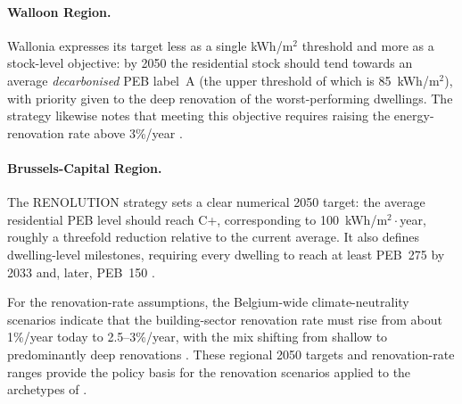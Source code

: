 \paragraph{Walloon Region.} Wallonia expresses its target less as a single
kWh/m$^2$ threshold and more as a stock-level objective: by 2050 the residential
stock should tend towards an average \emph{decarbonised} PEB label~A (the upper
threshold of which is 85~kWh/m$^2$), with priority given to the deep renovation of
the worst-performing dwellings. The strategy likewise notes that meeting this
objective requires raising the energy-renovation rate above 3\%/year
\cite{wallonia_ltrs_2020}.

\paragraph{Brussels-Capital Region.} The RENOLUTION strategy sets a clear
numerical 2050 target: the average residential PEB level should reach C+,
corresponding to 100~kWh/m$^2\cdot$year, roughly a threefold reduction relative
to the current average. It also defines dwelling-level milestones, requiring every
dwelling to reach at least PEB~275 by 2033 and, later, PEB~150
\cite{renolution_brussels}.

For the renovation-rate assumptions, the Belgium-wide climate-neutrality
scenarios indicate that the building-sector renovation rate must rise from about
1\%/year today to 2.5--3\%/year, with the mix shifting from shallow to
predominantly deep renovations \cite{climat_neutral_be_2050}. These regional 2050
targets and renovation-rate ranges provide the policy basis for the renovation
scenarios applied to the archetypes of .
